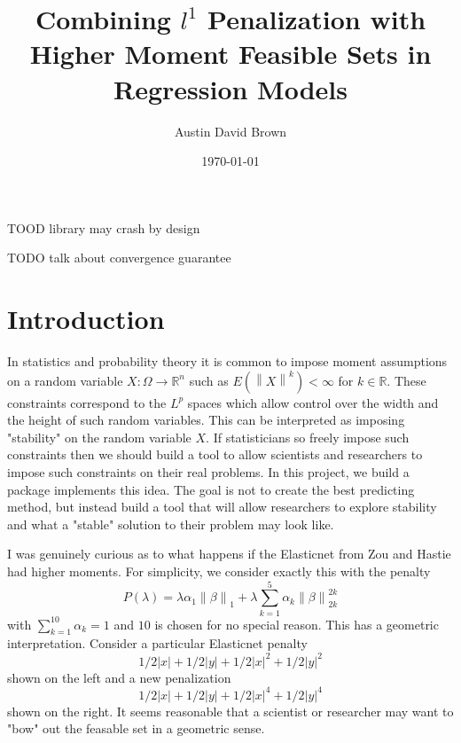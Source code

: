 \documentclass[12pt, a4paper, reqno]{article}
\newcommand{\forceindent}{\leavevmode{\parindent=1em\indent}}
\numberwithin{equation}{section}
\newcommand{\norm}[1]{\left\lVert#1\right\rVert}
\newcommand{\R}{\mathbb{R}}
\begin{document}
\title{Combining $l^1$ Penalization with Higher Moment Feasible Sets in Regression Models}
\author{Austin David Brown}
\date{\today}
\maketitle


TOOD library may crash by design

TODO talk about convergence guarantee

\section{Introduction}

In statistics and probability theory it is common to impose moment assumptions on a random variable $X : \Omega \to \R^n$ such as $E(\norm{X}^k) < \infty$ for $k \in \R$.
These constraints correspond to the $L^p$ spaces which allow control over the width and the height of such random variables.
This can be interpreted as imposing "stability" on the random variable $X$.
If statisticians so freely impose such constraints then we should build a tool to allow scientists and researchers to impose such constraints on their real problems.
In this project, we build a package implements this idea.
The goal is not to create the best predicting method, but instead build a tool that will allow researchers to explore stability and what a "stable" solution to their problem may look like.

\forceindent I was genuinely curious as to what happens if the Elasticnet from Zou and Hastie \cite{elasticnet} had higher moments.
For simplicity, we consider exactly this with the penalty
\[
P(\lambda) = \lambda \alpha_1 \norm{\beta}_1 + \lambda \sum_{k = 1}^{5} \alpha_k \norm{\beta}_{2k}^{2k} 
\]
with $\sum_{k = 1}^{10} \alpha_k = 1$ and $10$ is chosen for no special reason.
This has a geometric interpretation.
Consider a particular Elasticnet penalty 
\[
1/2 |x| + 1/2 |y| + 1/2|x|^2 + 1/2|y|^2
\]
 shown on the left and a new penalization 
 \[
 1/2|x| + 1/2|y| + 1/2|x|^4 + 1/2|y|^4
 \] shown on the right.
It seems reasonable that a scientist or researcher may want to "bow" out the feasable set in a geometric sense.
\end{document}
